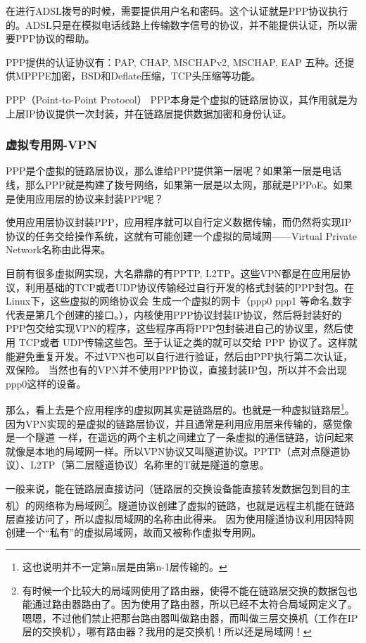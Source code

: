 
在进行ADSL拨号的时候，需要提供用户名和密码。这个认证就是PPP协议执行的。ADSL只是在模拟电话线路上传输数字信号的协议，并不能提供认证，所以需要PPP协议的帮助。

PPP提供的认证协议有：PAP, CHAP, MSCHAPv2, MSCHAP, EAP 五种。还提供MPPPE加密，BSD和Deflate压缩，TCP头压缩等功能。

PPP（Point-to-Point Protocol） PPP本身是个虚拟的链路层协议，其作用就是为上层IP协议提供一次封装，并在链路层提供数据加密和身份认证。

\subsubsection{虚拟专用网-VPN}

PPP是个虚拟的链路层协议，那么谁给PPP提供第一层呢？如果第一层是电话线，那么PPP就是构建了拨号网络，如果第一层是以太网，那就是PPPoE。如果是使用应用层的协议来封装PPP呢？

使用应用层协议封装PPP，应用程序就可以自行定义数据传输，而仍然将实现IP协议的任务交给操作系统，这就有可能创建一个虚拟的局域网——Virtual Private Network名称由此得来。

目前有很多虚拟网实现，大名鼎鼎的有PPTP, L2TP。这些VPN都是在应用层协议，利用基础的TCP或者UDP协议传输经过自行开发的格式封装的PPP封包。在Linux下，这些虚拟的网络协议会
生成一个虚拟的网卡（ppp0 ppp1 等命名,数字代表是第几个创建的接口。），内核使用PPP协议封装IP协议，然后将封装好的PPP包交给实现VPN的程序，这些程序再将PPP包封装进自己的协议里，然后使用 TCP或者 UDP传输这些包。至于认证之类的就可以交给 PPP 协议了。这样就能避免重复开发。不过VPN也可以自行进行验证，然后由PPP执行第二次认证，双保险。%
当然也有的VPN并不使用PPP协议，直接封装IP包，所以并不会出现ppp0这样的设备。

那么，看上去是个应用程序的虚拟网其实是链路层的。也就是一种虚拟链路层\footnote{这也说明并不一定第n层是由第n-1层传输的。}。
因为VPN实现的是虚拟的链路层协议，并且通常是利用应用层来传输的，感觉像是一个隧道
一样，在遥远的两个主机之间建立了一条虚拟的通信链路，访问起来就像是本地的局域网一样。所以VPN协议又叫隧道协议。PPTP（点对点隧道协议）、L2TP（第二层隧道协议）名称里的T就是隧道的意思。

一般来说，能在链路层直接访问（链路层的交换设备能直接转发数据包到目的主机）的网络称为局域网\footnote{有时候一个比较大的局域网使用了路由器，使得不能在链路层交换的数据包也能通过路由器路由了。因为使用了路由器，所以已经不太符合局域网定义了。嗯嗯，不过他们禁止把那台路由器叫做路由器，而叫做三层交换机（工作在IP层的交换机），哪有路由器？我用的是交换机！所以还是局域网！}。隧道协议创建了虚拟的链路，也就是远程主机能在链路层直接访问了，所以虚拟局域网的名称由此得来。
因为使用隧道协议利用因特网创建一个“私有”的虚拟局域网，故而又被称作虚拟专用网。

